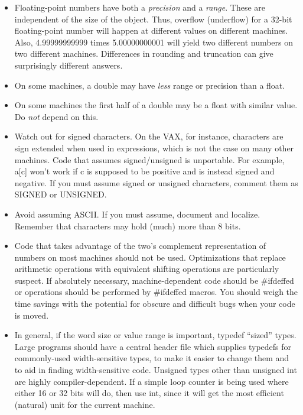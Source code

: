 \begin{itemize}
\item Floating-point numbers have both a {\em precision} and a {\em range}.
These are independent of the size of the object. Thus, overflow (underflow)
for a 32-bit floating-point number will happen at different values on
different machines. Also, 4.99999999999 times 5.00000000001 will yield two
different numbers on two different machines. Differences in rounding and
truncation can give surprisingly different answers.

\item On some machines, a double may have {\em less} range or precision than
a float. 

\item On some machines the first half of a double may be a float with similar
value. Do {\em not} depend on this. 

\item Watch out for signed characters. On the VAX, for instance, characters are
sign extended when used in expressions, which is not the case on many other
machines. Code that assumes signed/unsigned is unportable. For example, a[c]
won't work if c is supposed to be positive and is instead signed and negative.
If you must assume signed or unsigned characters, comment them as SIGNED or
UNSIGNED.

\item Avoid assuming ASCII. If you must assume, document and localize. Remember
that characters may hold (much) more than 8 bits. 

\item Code that takes advantage of the two's complement representation of
numbers on most machines should not be used. Optimizations that replace
arithmetic operations with equivalent shifting operations are particularly
suspect. If absolutely necessary, machine-dependent code should be \#ifdeffed
or operations should be performed by \#ifdeffed macros. You should weigh the
time savings with the potential for obscure and difficult bugs when your code
is moved. 

\item In general, if the word size or value range is important, typedef
``sized'' types. Large programs should have a central header file which
supplies typedefs for commonly-used width-sensitive types, to make it easier
to change them and to aid in finding width-sensitive code. Unsigned types
other than unsigned int are highly compiler-dependent. If a simple loop
counter is being used where either 16 or 32 bits will do, then use int, since 
it will get the most efficient (natural) unit for the current machine. 


\end{itemize}
